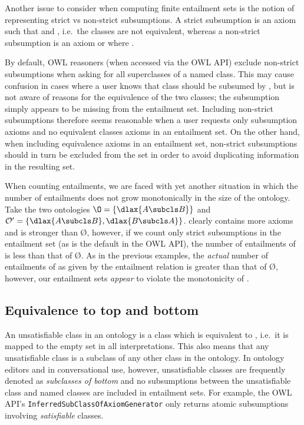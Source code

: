 Another issue to consider when computing finite entailment sets is the notion of representing strict vs non-strict subsumptions. A strict subsumption is an axiom  such that  and , i.e.\ the classes are not equivalent, whereas a non-strict subsumption is an axiom  or   where . 

By default, OWL reasoners (when accessed via the OWL API) exclude non-strict subsumptions when asking for all superclasses of a named class. This may cause confusion in cases where a user knows that class  should be subsumed by , but is not aware of reasons for the equivalence of the two classes; the subsumption simply appears to be missing from the entailment set. Including non-strict subsumptions therefore seems reasonable when a user requests only subsumption axioms and no equivalent classes axioms in an entailment set. On the other hand, when including equivalence  axioms in an entailment set, non-strict subsumptions should in turn be excluded from the set in order to avoid duplicating information in the resulting set.

When counting entailments, we are faced with yet another situation in which the number of entailments does not grow monotonically in the size of the ontology. Take the two ontologies $\O = \{\dlax{A \subcls B}\}$ and $\oprime = \{\dlax{A \subcls B}, \dlax{B \subcls A}\}$. \oprime clearly contains more axioms and is stronger than \O, however, if we count only strict subsumptions in the entailment set (as is the default in the OWL API), the number of entailments of \oprime is less than that of \O. As in the previous examples, the \emph{actual} number of entailments of \oprime as given by the entailment relation \entails is greater than that of \O, however, our entailment sets \emph{appear} to violate the monotonicity of \entails.

\subsection{Equivalence to top and bottom}

An unsatisfiable class in an ontology is a class which is equivalent to \nothing, i.e.\ it is mapped to the empty set in all interpretations. This also means that any unsatisfiable class is a subclass of any other class in the ontology. In ontology editors and in conversational use, however, unsatisfiable classes are frequently denoted as \emph{subclasses of bottom} and no subsumptions between the unsatisfiable class and named classes are included in entailment sets. For example, the OWL API's \texttt{InferredSubClassOfAxiomGenerator} only returns atomic subsumptions involving \emph{satisfiable} classes.

